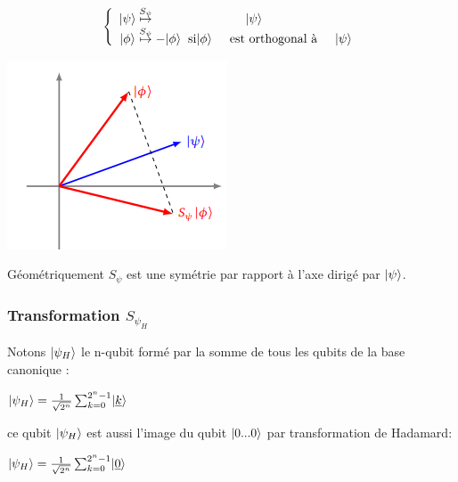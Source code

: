 \documentclass[12pt,openany]{report}
\DeclarePairedDelimiter\ket{\lvert}{\rangle}
\begin{document}
\[  
  \left\lbrace 
\begin{array}{ c @{\hspace{0.1cm}\overset{S_{\psi}}{\mapsto}\hspace{0.1cm}}  c }
\ket{\psi}& \ket{\psi}\\

\ket{\phi}& -\ket{\phi} \hspace{0.2cm} \text{si} \ket{\phi} \hspace{0.5cm}\text{est orthogonal à} \hspace{0.5cm} \ket{\psi}
\end{array}
\right.
\]
\begin{center}
\includegraphics[scale=1]{./symphi}
\end{center}

Géométriquement $S_{\psi} $ est une symétrie par rapport à l'axe dirigé par $\ket{\psi} $. 
\subsubsection{Transformation $\mathit{S}_{\psi_H} $}

Notons  $\ket{\psi_H} $ le n-qubit formé par la somme de tous les qubits de la base canonique :


\begin{center}
$  \ket{\psi_H}=\frac{1}{\sqrt{2^n}}\sum_{k=0}^{2^n-1}\ket{\underline{k}} $
\end{center}
ce qubit $\ket{\psi_H} $ est aussi l'image du qubit $\ket{0...0} $ par transformation de Hadamard:

\begin{center}
$  \ket{\psi_H}=\frac{1}{\sqrt{2^n}}\sum_{k=0}^{2^n-1}\ket{\underline{0}} $
\end{center}
\end{document}
